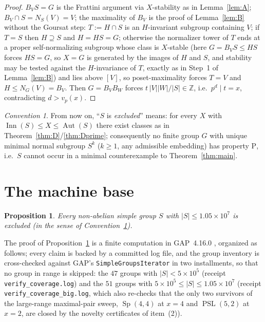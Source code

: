 \documentclass[11pt]{amsart}
\newtheorem{proposition}[theorem]{Proposition}
\theoremstyle{definition}
\theoremstyle{remark}
\newtheorem{convention}[theorem]{Convention}
\DeclareMathOperator{\Inn}{Inn}
\DeclareMathOperator{\Aut}{Aut}
\DeclareMathOperator{\PSL}{PSL}
\DeclareMathOperator{\Sp}{Sp}
\newcommand{\Z}{\mathbb{Z}}
\newcommand{\vp}[1]{v_{#1}}
\begin{document}
\begin{proof}
$B_VS=G$ is the Frattini argument via $X$-stability as in
Lemma~\ref{lem:A}; $B_V\cap S=N_S(V)=V$; the maximality of $B_V$ is the
proof of Lemma~\ref{lem:B} without the Goursat step: $T:=H\cap S$ is an
$H$-invariant subgroup containing $V$; if $T=S$ then $H\supseteq S$ and
$H=HS=G$; otherwise the normalizer tower of $T$ ends at a proper
self-normalizing subgroup whose class is $X$-stable (here
$G=B_VS\leq HS$ forces $HS=G$, so $X=G$ is generated by the images of
$H$ and $S$, and stability may be tested against the $H$-invariance of
$T$, exactly as in Step~1 of Lemma~\ref{lem:B}) and lies above $[V]$,
so poset-maximality forces $T=V$ and $H\leq N_G(V)=B_V$. Then
$G=B_VB_W$ forces $t\,|V||W|/|S|\in\Z$, i.e.\ $p^d\mid t=x$,
contradicting $d>\vp{p}(x)$.
\end{proof}

\begin{convention}\label{conv:excluded}
From now on, ``$S$ is \emph{excluded}'' means: for every $X$ with
$\Inn(S)\leq X\leq\Aut(S)$ there exist classes as in
Theorem~\ref{thm:D}/\ref{thm:Dprime}; consequently no finite group $G$
with unique minimal normal subgroup $S^k$ ($k\geq1$, any admissible
embedding) has property $\mathrm{P}$, i.e.\ $S$ cannot occur in a
minimal counterexample to Theorem~\ref{thm:main}.
\end{convention}

\section{The machine base}\label{sec:machine}

\begin{proposition}\label{prop:base}
Every non-abelian simple group $S$ with $|S|\leq 1.05\times10^{7}$ is
excluded (in the sense of Convention~\ref{conv:excluded}).
\end{proposition}

The proof of Proposition~\ref{prop:base} is a finite computation in
GAP~4.16.0 \cite{GAP}, organized as follows; every claim is backed by a
committed log file, and the group inventory is cross-checked against
GAP's \texttt{SimpleGroupsIterator} in two installments, so that no
group in range is skipped: the $47$ groups with $|S|<5\times10^5$
(receipt \texttt{verify\_coverage.log}) and the $51$ groups with
$5\times10^5\leq|S|\leq1.05\times10^7$ (receipt
\texttt{verify\_coverage\_big.log}, which also re-checks that the only
two survivors of the large-range maximal-pair sweep, $\Sp(4,4)$ at
$x=4$ and $\PSL(5,2)$ at $x=2$, are closed by the novelty certificates
of item~(2)).
\end{document}
